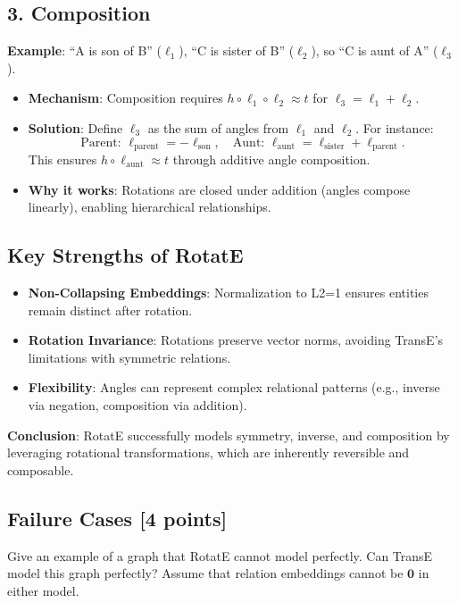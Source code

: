 \documentclass[11pt]{article}
\numberwithin{figure}{section}
\begin{document}
\subsection*{3. Composition}
\textbf{Example}: ``A is son of B'' ($\ell_1$), ``C is sister of B'' ($\ell_2$), so ``C is aunt of A'' ($\ell_3$).
\begin{itemize}
    \item \textbf{Mechanism}: Composition requires $h \circ \ell_1 \circ \ell_2 \approx t$ for $\ell_3 = \ell_1 + \ell_2$.
    \item \textbf{Solution}: Define $\ell_3$ as the sum of angles from $\ell_1$ and $\ell_2$. For instance:
    \[
    \text{Parent: } \ell_{\text{parent}} = -\ell_{\text{son}}, \quad \text{Aunt: } \ell_{\text{aunt}} = \ell_{\text{sister}} + \ell_{\text{parent}}.
    \]
    This ensures $h \circ \ell_{\text{aunt}} \approx t$ through additive angle composition.
    \item \textbf{Why it works}: Rotations are closed under addition (angles compose linearly), enabling hierarchical relationships.
\end{itemize}

\subsection*{Key Strengths of RotatE}
\begin{itemize}
    \item \textbf{Non-Collapsing Embeddings}: Normalization to L2=1 ensures entities remain distinct after rotation.
    \item \textbf{Rotation Invariance}: Rotations preserve vector norms, avoiding TransE’s limitations with symmetric relations.
    \item \textbf{Flexibility}: Angles can represent complex relational patterns (e.g., inverse via negation, composition via addition).
\end{itemize}

\textbf{Conclusion}: RotatE successfully models symmetry, inverse, and composition by leveraging rotational transformations, which are inherently reversible and composable.


\subsection{Failure Cases [4 points]}
Give an example of a graph that RotatE cannot model perfectly. Can TransE model this graph perfectly? Assume that relation embeddings cannot be $\mathbf{0}$ in either model.
\end{document}
